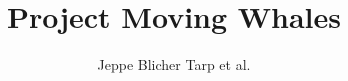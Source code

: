 \pagestyle{empty} %
\title{Project Moving Whales}
\author{Jeppe Blicher Tarp et al.}
\date{} %
\maketitle
